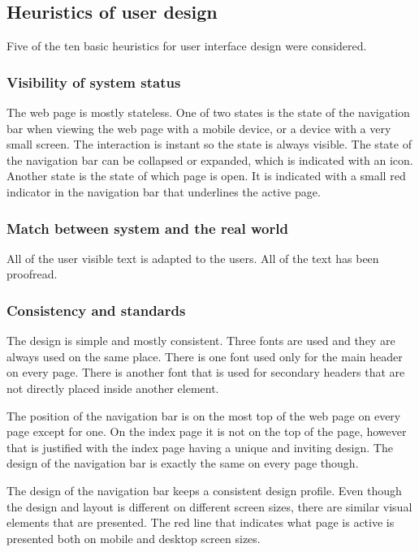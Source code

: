 \documentclass[a4paper]{scrartcl}
\begin{document}
\subsection{Heuristics of user design}

Five of the ten basic heuristics for user interface design were considered.

\subsubsection{Visibility of system status}
The web page is mostly stateless. One of two states is the state of the navigation bar when viewing the web page with a mobile device, or a device with a very small screen. The interaction is instant so the state is always visible. The state of the navigation bar can be collapsed or expanded, which is indicated with an icon. Another state is the state of which page is open. It is indicated with a small red indicator in the navigation bar that underlines the active page.

\subsubsection{Match between system and the real world}
All of the user visible text is adapted to the users. All of the text has been proofread.

\subsubsection{Consistency and standards}
The design is simple and mostly consistent. Three fonts are used and they are always used on the same place. There is one font used only for the main header on every page. There is another font that is used for secondary headers that are not directly placed inside another element.

The position of the navigation bar is on the most top of the web page on every page except for one. On the index page it is not on the top of the page, however that is justified with the index page having a unique and inviting design. The design of the navigation bar is exactly the same on every page though.

The design of the navigation bar keeps a consistent design profile. Even though the design and layout is different on different screen sizes, there are similar visual elements that are presented. The red line that indicates what page is active is presented both on mobile and desktop screen sizes.
\end{document}
